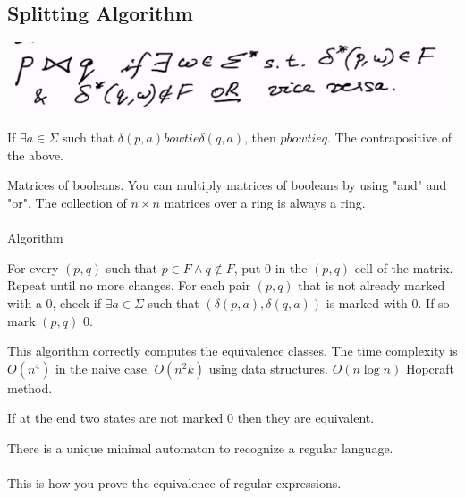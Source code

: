 \documentclass[class=scrartcl, crop=false]{standalone}
\begin{document}
\subsection{Splitting Algorithm}

\includegraphics[width=\textwidth]{splittingalgorithm}

\begin{fact}
  If $\exists a \in \Sigma$ such that $\delta(p, a) bowtie \delta(q, a)$, then $p bowtie q$. The contrapositive of the above.
\end{fact} 

Matrices of booleans. You can multiply matrices of booleans by using "and" and "or". The collection of $n \times n$ matrices over a ring is always a ring.
\\\\
Algorithm
\begin{enumerate}
  \ii
  For every $(p, q)$ such that $p \in F \wedge q \notin F$, put $0$ in the $(p, q)$ cell of the matrix.
  \ii
  Repeat until no more changes. For each pair $(p, q)$ that is not already marked with a 0, check if $\exists a \in \Sigma$ such that $(\delta(p, a), \delta(q, a))$ is marked with 0. If so mark $(p, q)$ 0.
\end{enumerate} 
This algorithm correctly computes the equivalence classes. The time complexity is $O(n^4)$ in the naive case. $O(n^2k)$ using data structures. $O(n\log n)$ Hopcraft method.

\begin{theorem}
  If at the end two states are not marked 0 then they are equivalent.
\end{theorem} 

\begin{theorem}
  There is a unique minimal automaton to recognize a regular language.
  \\\\
  This is how you prove the equivalence of regular expressions.
\end{theorem} 
\end{document}
